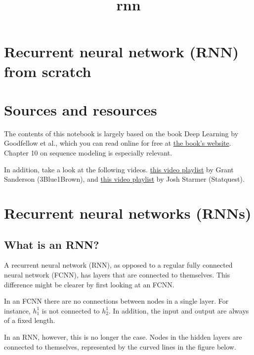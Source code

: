 \documentclass[11pt]{article}
\title{rnn}
\begin{document}
    
    \maketitle
    
    

    
    \section{Recurrent neural network (RNN) from
scratch}\label{recurrent-neural-network-rnn-from-scratch}

    \section{Sources and resources}\label{sources-and-resources}

    The contents of this notebook is largely based on the book Deep Learning
by Goodfellow et al., which you can read  online for free at \href{https://www.deeplearningbook.org/}{the
book's website}. Chapter 10 on sequence modeling is especially relevant.


In addition, take a look at the following videos.
\href{https://www.youtube.com/playlist?list=PLZHQObOWTQDNU6R1_67000Dx_ZCJB-3pi}{this
video playlist} by Grant Sanderson (3Blue1Brown), and
\href{https://www.youtube.com/playlist?list=PLblh5JKOoLUIxGDQs4LFFD--41Vzf-ME1}{this
video playlist} by Josh Starmer (Statquest).

    \section{Recurrent neural networks
(RNNs)}\label{recurrent-neural-networks-rnns}

    \subsection{What is an RNN?}\label{what-is-an-rnn}

    A recurrent neural network (RNN), as opposed to a regular fully
connected neural network (FCNN), has layers that are connected to
themselves. This difference might be clearer by first looking at an
FCNN.

    

    In an FCNN there are no connections between nodes in a single layer. For
instance, \(h_1^1\) is not connected to \(h_2^1\). In addition, the
input and output are always of a fixed length.

    In an RNN, however, this is no longer the case. Nodes in the hidden
layers are connected to themselves, represented by the curved lines in
the figure below.
\end{document}
